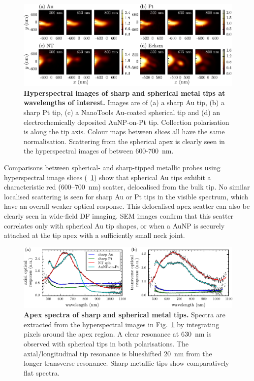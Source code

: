 \documentclass{article}
\begin{document}
\begin{figure}[bt]
\centering
\includegraphics{figures/hyperspectral_tip_comparison}
\caption[Hyperspectral images of sharp and spherical metal tips at wavelengths of interest]{\textbf{Hyperspectral images of sharp and spherical metal tips at wavelengths of interest.} Images are of (a) a sharp Au tip, (b) a sharp Pt tip, (c) a NanoTools Au-coated spherical tip and (d) an electrochemically deposited AuNP-on-Pt tip. Collection polarisation is along the tip axis. Colour maps between slices all have the same normalisation.
Scattering from the spherical apex is clearly seen in the hyperspectral images of between 600-\SI{700}{nm}.}
\label{fig:hyperspectral_tip_comparison}
\vspace{-5pt}
\end{figure}

Comparisons between spherical- and sharp-tipped metallic probes using hyperspectral image slices (\figurename~\ref{fig:hyperspectral_tip_comparison}) show that spherical Au tips exhibit a characteristic red (600--\SI{700}{nm}) scatter, delocalised from the bulk tip. No similar localised scattering is seen for sharp Au or Pt tips in the visible spectrum, which have an overall weaker optical response. This delocalised apex scatter can also be clearly seen in wide-field DF imaging. SEM images confirm that this scatter correlates only with spherical Au tip shapes, or when a AuNP is securely attached at the tip apex with a sufficiently small neck joint.

\begin{figure}[bt]
\centering
\includegraphics{figures/apex_spectra_comparison}
\caption[Apex spectra of sharp and spherical metal tips]{\textbf{Apex spectra of sharp and spherical metal tips.} Spectra are extracted from the hyperspectral images in Fig.~\ref{fig:hyperspectral_tip_comparison} by integrating pixels around the apex region. A clear resonance at \SI{630}{nm} is observed with spherical tips in both polarisations. The axial/longitudinal tip resonance is blueshifted \SI{20}{nm} from the longer transverse resonance. Sharp metallic tips show comparatively flat spectra.}
\label{fig:apex_spectra}
\vspace{-5pt}
\end{figure}
\end{document}
